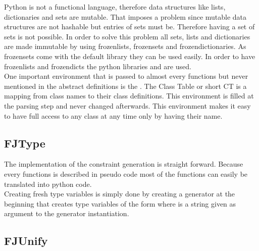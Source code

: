 Python is not a functional language, therefore data structures like lists, dictionaries and sets are mutable. That imposes a problem since mutable data structures are not hashable but entries of sets must be. Therefore having a set of sets is not possible.
In order to solve this problem all sets, lists and dictionaries are made immutable by using frozenlists, frozensets and frozendictionaries. As frozensets come with the default library they can be used easily. In order to have frozenlists and frozendicts the python libraries  and  are used.\\
One important environment that is passed to almost every functions but never mentioned in the abstract definitions is the . The Class Table or short CT is a mapping from class names to their class definitions. This environment is filled at the parsing step and never changed afterwards. This environment makes it easy to have full access to any class at any time only by having their name.\\



\subsection{FJType}
The implementation of the constraint generation is straight forward. Because every functions is described in pseudo code most of the functions can easily be translated into python code. \\
Creating fresh type variables is simply done by creating a generator at the beginning that creates type variables of the form  where  is a string given as argument to the generator instantiation. \\

\subsection{FJUnify}

